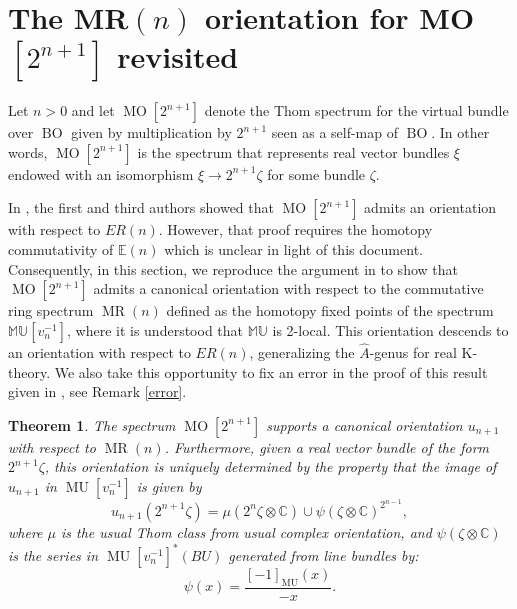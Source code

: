 \documentclass[12pt]{amsart}
\numberwithin{equation}{section}
\theoremstyle{plain}  %
\newtheorem{thm}[equation]{Theorem}
\theoremstyle{definition}  %
\newcommand{\CC}{\mathbb{C}}
\newcommand{\ER}{\mathbb{E}}
\newcommand{\colim}{\text{colim }}
\newcommand{\MU}{\mathbb {MU}}
\DeclareMathOperator{\BOg}{BO}
\DeclareMathOperator{\MO}{MO}
\DeclareMathOperator{\MUR}{MR}
\DeclareMathOperator{\MUg}{MU}
\begin{document}




\section{The MR$(n)$ orientation for MO$[2^{n+1}]$ revisited} %

\medskip
\noindent
Let $n > 0$ and let $\MO[2^{n+1}]$ denote the Thom spectrum for the virtual bundle over $\BOg$ given by multiplication by $2^{n+1}$ seen as a self-map of $\BOg$. In other words, $\MO[2^{n+1}]$ is the spectrum that represents real vector bundles $\xi$ endowed with an isomorphism $\xi \rightarrow 2^{n+1} \zeta$ for some bundle $\zeta$. 

\medskip
\noindent
In \cite{KW14}, the first and third authors showed that $\MO[2^{n+1}]$ admits an orientation with respect to $ER(n)$. However, that proof requires the homotopy commutativity of $\ER(n)$ which is unclear in light of this document. Consequently, in this section, we reproduce the argument in \cite{KW14} to show that $\MO[2^{n+1}]$ admits a canonical orientation with respect to the commutative ring spectrum $\MUR(n)$ defined as the homotopy fixed points of the spectrum $\MU [v_n^{-1}]$, where it is understood that $\MU$ is 2-local. This orientation descends to an orientation with respect to $ER(n)$, generalizing the $\hat{A}$-genus for real K-theory. We also take this opportunity to fix an error in the proof of this result given in \cite{KW14}, see Remark \ref{error}. 

\bigskip
\begin{thm} \label{main} 
The spectrum $\MO[2^{n+1}]$ supports a canonical orientation $u_{n+1}$ with respect to $\MUR(n)$. Furthermore, given a real vector bundle of the form $2^{n+1} \zeta$, this orientation is uniquely determined by the property that the image of $u_{n+1}$ in $\MUg[v_n^{-1}]$ is given by
\[ u_{n+1}(2^{n+1} \zeta) = \mu(2^n \zeta \otimes \CC) \cup \psi(\zeta \otimes \CC)^{2^{n-1}}, \]
where $\mu$ is the usual Thom class from usual complex orientation, and $\psi(\zeta \otimes \CC)$ is the series in $\MUg[v_n^{-1}]^*(BU)$ generated from line bundles by:
\[ \psi(x) = \frac{[-1]_{\MUg} (x)}{-x}. \]
\end{thm}
\end{document}
